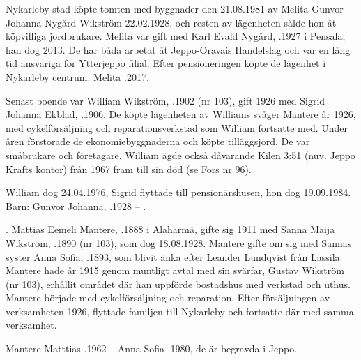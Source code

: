 
Nykarleby stad köpte tomten med byggnader den 21.08.1981 av Melita Gunvor Johanna Nygård \textborn Wikström 22.02.1928, och resten av lägenheten sålde hon åt köpvilliga jordbrukare. Melita var gift med Karl Evald Nygård, .1927 i Pensala, han dog 2013. De har båda arbetat åt Jeppo-Oravais Handelslag och var en lång tid ansvariga för Ytterjeppo filial. Efter pensioneringen köpte de lägenhet i Nykarleby centrum. Melita .2017.


Senast boende var William Wikström, .1902 (nr 103), gift 1926 med Sigrid Johanna Ekblad, .1906. De köpte lägenheten av Williams svåger Mantere år 1926, med cykelförsäljning och reparationsverkstad som William fortsatte med. Under åren förstorade de ekonomiebyggnaderna och köpte tilläggsjord. De var småbrukare och företagare. William ägde också dåvarande Kilen 3:51 (nuv. Jeppo Krafts kontor) från 1967 fram till sin död (se Fors nr 96).

William dog 24.04.1976, Sigrid flyttade till pensionärshusen, hon dog 19.09.1984.
Barn: Gunvor Johanna, .1928 --  .

                    .
Mattias Eemeli Mantere, .1888 i Alahärmä, gifte sig 1911 med Sanna Maija Wikström, .1890 (nr 103), som dog 18.08.1928. Mantere gifte om sig med Sannas syster Anna Sofia, .1893, som blivit änka efter Leander Lundqvist från Lassila. Mantere hade år 1915 genom  muntligt avtal med sin svärfar, Gustav Wikström (nr 103), erhållit området där han uppförde bostadshus med verkstad och uthus. Mantere började med cykelförsäljning och reparation. Efter försäljningen av verksamheten 1926, flyttade familjen till Nykarleby och fortsatte där med samma verksamhet.
\begin{jhchildren}
  \item {}
  \item {}
  \item {}
  \item {}
  \item {}
  \item {}
  \item {}
  \item {}
\end{jhchildren}
Mantere Matttias .1962  --  Anna Sofia .1980, de är begravda i Jeppo.



